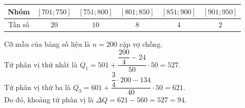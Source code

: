 \begin{bt}
{\begin{center}
\begin{tabular}{|c|c|c|c|c|c|}
				\hline Nhóm  & $[701 ; 750]$ &$[751 ; 800]$&$[801 ; 850]$& $[851 ; 900]$ & $[901 ; 950]$ \\
				\hline Tần số & $20$ &$10$& $8$ & $4$ & $2$ \\
				\hline
			\end{tabular}
		\end{center}
		Cỡ mẫu của bảng số liệu là $n=200$ cặp vợ chồng.\\
		Tứ phân vị thứ nhất là $Q_1=501+\dfrac{\dfrac{200}{4}-24}{50}\cdot 50=527$.\\
		Tứ phân vị thứ ba là $Q_3=601+\dfrac{\dfrac{3}{4}\cdot 200-134}{40}\cdot 50=621$.\\
		Do đó, khoảng tứ phân vị là $\Delta Q=621 - 560 = 527 = 94$.
		
	}
\end{bt}

